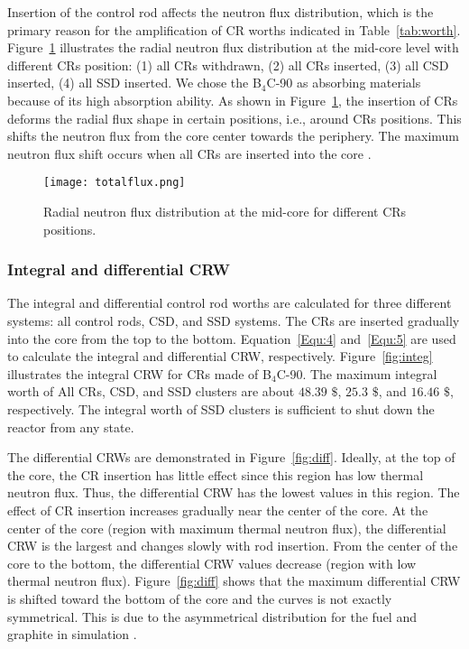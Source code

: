 Insertion of the control rod affects the neutron flux distribution, which is 
the primary reason for the amplification of CR worths indicated in 
Table~\ref{tab:worth}. Figure~\ref{fig:totalflux} illustrates the radial 
neutron flux distribution at the mid-core level with different CRs position: 
(1) all CRs withdrawn, (2) all CRs inserted, (3) all CSD inserted, (4) all SSD 
inserted. We chose the B$_4$C-90 as absorbing materials because of its high 
absorption ability. As shown in Figure~\ref{fig:totalflux}, the insertion of 
CRs deforms the radial flux shape in certain positions, i.e., around CRs 
positions. This shifts the neutron flux from the core center towards the 
periphery. The maximum neutron flux shift occurs when all CRs are inserted 
into the core \cite{girardin2007control}.
\begin{figure}[!ht]
	\centering
	\texttt{[image: totalflux.png]}
	\vspace{-0.5in}
	\caption{Radial neutron flux distribution at the mid-core for different 
	CRs positions.} 
	\label{fig:totalflux}
\end{figure}
 

\subsubsection{Integral and differential CRW}

The integral and differential control rod worths are calculated for three 
different systems: all control rods, CSD, and SSD systems. The CRs are 
inserted gradually into the core from the top to the bottom. 
Equation~\ref{Equ:4} and~\ref{Equ:5} are used to calculate the integral and 
differential CRW, respectively. Figure~\ref{fig:integ} illustrates the integral CRW for CRs 
made of B$_4$C-90. The maximum integral worth of All CRs, CSD, and SSD 
clusters are about $48.39$ $\$$, $25.3$ $\$$, and $16.46$ $\$$, respectively. The 
integral worth of SSD clusters is sufficient to shut down the reactor from any 
state.

The differential CRWs are demonstrated in Figure~\ref{fig:diff}. Ideally, at the top of the core, the CR insertion has little effect since this region has low thermal neutron flux. Thus, the differential CRW has the lowest values in this region. The effect of CR insertion increases gradually near the center of the core. At the center of the core (region with maximum thermal neutron flux), the differential CRW is the largest and changes slowly with rod insertion. From the center of the core to the bottom, the differential CRW values decrease (region with low thermal neutron flux). Figure~\ref{fig:diff} shows that the maximum differential CRW is shifted toward the bottom of the core and the curves is not exactly symmetrical. This is due to the asymmetrical distribution for the fuel and graphite in simulation \cite{xuemei2013study,son2016control}.

